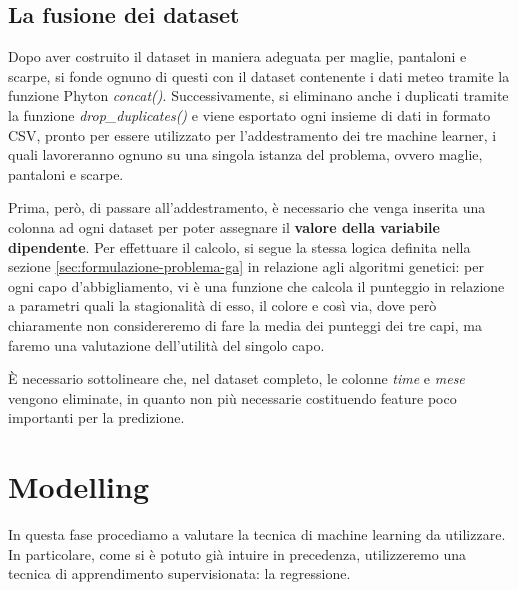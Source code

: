 \documentclass[a4paper, 11pt, oneside]{report}
\begin{document}
                \bigskip

                \subsection{La fusione dei dataset}
                Dopo aver costruito il dataset in maniera adeguata per maglie, pantaloni e scarpe, si fonde ognuno di
                questi con il dataset contenente i dati meteo tramite la funzione Phyton \textit{concat()}. Successivamente,
                si eliminano anche i duplicati tramite la funzione \textit{drop\_duplicates()} e viene esportato ogni insieme
                di dati in formato CSV, pronto per essere utilizzato per l'addestramento dei tre machine learner,
                i quali lavoreranno ognuno su una singola istanza del problema, ovvero maglie, pantaloni
                e scarpe.\\
                \par \noindent Prima, però, di passare all'addestramento,
                è necessario che venga inserita una colonna ad ogni dataset per poter assegnare il \textbf{valore della variabile dipendente}.
                Per effettuare il calcolo, si segue la stessa logica definita nella sezione \ref{sec:formulazione-problema-ga} in relazione agli algoritmi genetici:
                per ogni capo d'abbigliamento, vi è una funzione che calcola il punteggio in relazione a parametri quali la stagionalità
                di esso, il colore e così via, dove però chiaramente non considereremo di fare la media dei punteggi dei
                tre capi, ma faremo una valutazione dell'utilità del singolo capo.\\
                \par \noindent \`E necessario sottolineare che, nel dataset completo, le colonne \textit{time}
                e \textit{mese} vengono eliminate, in quanto non più necessarie costituendo feature poco importanti per la predizione.

            \newpage
            \section{Modelling}
            In questa fase procediamo a valutare la tecnica di machine learning da utilizzare. In particolare, come si è
            potuto già intuire in precedenza, utilizzeremo una tecnica di apprendimento supervisionata: la
            regressione.
\end{document}
